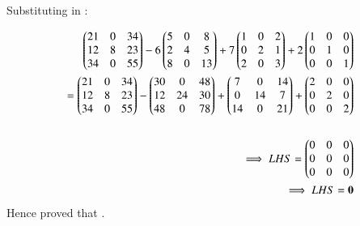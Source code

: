 \documentclass[journal,12pt,twocolumn]{IEEEtran}
\begin{document}
Substituting in :

\begin{align}
    \begin{pmatrix}21 & 0 & 34\\ 12 & 8 & 23\\ 34 & 0 & 55\end{pmatrix} - 6\begin{pmatrix}5 & 0 & 8 \\ 2 & 4 & 5 \\ 8 & 0 & 13\end{pmatrix} + 7\begin{pmatrix}1 & 0 & 2 \\ 0 & 2 & 1 \\ 2 & 0 & 3\end{pmatrix}+2\begin{pmatrix}1 & 0 & 0 \\ 0 & 1 & 0 \\ 0 & 0 & 1\end{pmatrix}
    \\
    = \begin{pmatrix}21 & 0 & 34\\ 12 & 8 & 23\\ 34 & 0 & 55\end{pmatrix} - \begin{pmatrix}30 & 0 & 48 \\ 12 & 24 & 30 \\ 48 & 0 & 78\end{pmatrix} + \begin{pmatrix}7 & 0 & 14 \\ 0 & 14 & 7 \\ 14 & 0 & 21\end{pmatrix}+\begin{pmatrix}2 & 0 & 0 \\ 0 & 2 & 0 \\ 0 & 0 & 2\end{pmatrix}
    \\
    \\\implies LHS =\begin{pmatrix}0 & 0 & 0 \\ 0 & 0 & 0 \\ 0 & 0 & 0\end{pmatrix}
    \\\implies LHS = \mathbf{0}
\end{align}
Hence proved that .
\end{document}
